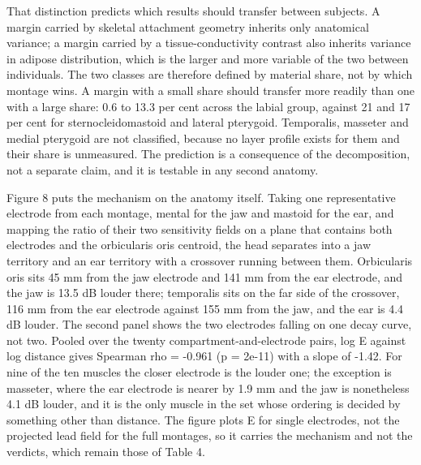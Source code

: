 \documentclass[
  11pt,
  a4paper,
]{article}
\newcounter{none} %
\begin{document}
That distinction predicts which results should transfer between subjects. A
margin carried by skeletal attachment geometry inherits only anatomical
variance; a margin carried by a tissue-conductivity contrast also inherits
variance in adipose distribution, which is the larger and more variable of the
two between individuals. The two classes are therefore defined by material
share, not by which montage wins. A margin with a small share should transfer
more readily than one with a large share: 0.6 to 13.3 per cent across the labial
group, against 21 and 17 per cent for sternocleidomastoid and lateral pterygoid.
Temporalis, masseter and medial pterygoid are not classified, because no layer
profile exists for them and their share is unmeasured. The prediction is a
consequence of the decomposition, not a separate claim, and it is testable in
any second anatomy.

Figure 8 puts the mechanism on the anatomy itself. Taking one representative
electrode from each montage, mental for the jaw and mastoid for the ear, and
mapping the ratio of their two sensitivity fields on a plane that contains both
electrodes and the orbicularis oris centroid, the head separates into a jaw
territory and an ear territory with a crossover running between them.
Orbicularis oris sits 45 mm from the jaw electrode and 141 mm from the ear
electrode, and the jaw is 13.5 dB louder there; temporalis sits on the far side
of the crossover, 116 mm from the ear electrode against 155 mm from the jaw, and
the ear is 4.4 dB louder. The second panel shows the two electrodes falling on
one decay curve, not two. Pooled over the twenty compartment-and-electrode
pairs, log \textbar E\textbar{} against log distance gives Spearman rho = -0.961 (p = 2e-11) with
a slope of -1.42. For nine of the ten muscles the closer electrode is the louder
one; the exception is masseter, where the ear electrode is nearer by 1.9 mm and
the jaw is nonetheless 4.1 dB louder, and it is the only muscle in the set whose
ordering is decided by something other than distance. The figure plots \textbar E\textbar{} for
single electrodes, not the projected lead field for the full montages, so it
carries the mechanism and not the verdicts, which remain those of Table 4.
\end{document}
